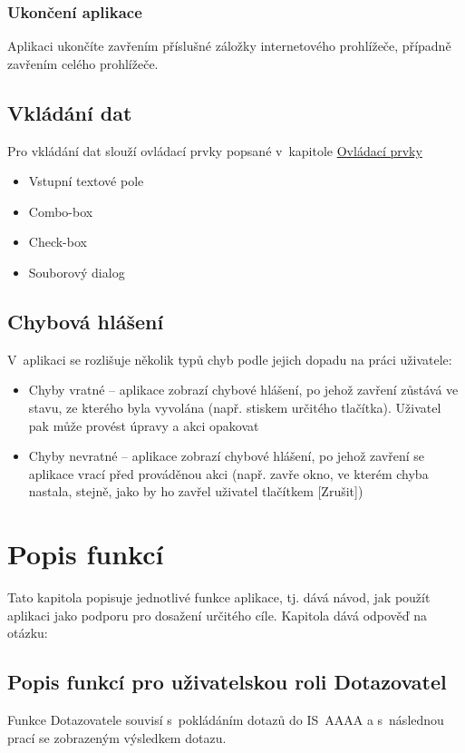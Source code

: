 \documentclass[thesis=M,czech]{FITthesis}[2019/12/23]
\begin{document}
\subsubsection{Ukončení aplikace}
Aplikaci ukončíte zavřením příslušné záložky internetového prohlížeče, případně zavřením celého prohlížeče.

\subsection{Vkládání dat}
Pro vkládání dat slouží ovládací prvky popsané v~kapitole \hyperref[OvladaciPrvky]{Ovládací prvky}
\begin{itemize}
	\item Vstupní textové pole
	\item Combo-box
	\item Check-box
	\item Souborový dialog
\end{itemize}

\subsection{Chybová hlášení}
V~aplikaci se rozlišuje několik typů chyb podle jejich dopadu na práci uživatele:
\begin{itemize}
	\item Chyby vratné – aplikace zobrazí chybové hlášení, po jehož zavření zůstává ve stavu, ze kterého byla vyvolána (např. stiskem určitého tlačítka). Uživatel pak může provést úpravy a akci opakovat
	\item Chyby nevratné – aplikace zobrazí chybové hlášení, po jehož zavření se aplikace vrací před prováděnou akci (např. zavře okno, ve kterém chyba nastala, stejně, jako by ho zavřel uživatel tlačítkem [Zrušit])
\end{itemize}

\section{Popis funkcí}
Tato kapitola popisuje jednotlivé funkce aplikace, tj. dává návod, jak použít aplikaci jako podporu pro dosažení určitého cíle. Kapitola dává odpověď na otázku: 

\subsection{Popis funkcí pro uživatelskou roli Dotazovatel}
Funkce Dotazovatele souvisí s~pokládáním dotazů do IS~AAAA a s~následnou prací se zobrazeným výsledkem dotazu.
\end{document}
